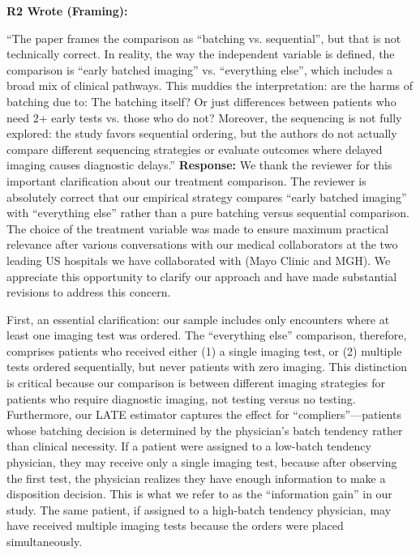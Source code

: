 \documentclass[11pt]{article}
\newenvironment{quote2}
{ \bigskip
\noindent
         \small\em
         \baselineskip=14pt
}
\newcommand{\1}{\hbox{\rm 1\kern-.35em 1}}
\begin{document}
\begin{quote2}
\textbf{R2 Wrote (Framing):}  


\noindent``The paper frames the comparison as ``batching vs. sequential'', but that is not technically correct. In reality, the way the independent variable is defined, the comparison is ``early batched imaging'' vs. ``everything else'', which includes a broad mix of clinical pathways. This muddies the interpretation: are the harms of batching due to: The batching itself? Or just differences between patients who need 2+ early tests vs. those who do not? Moreover, the sequencing is not fully explored: the study favors sequential ordering, but the authors do not actually compare different sequencing strategies or evaluate outcomes where delayed imaging causes diagnostic delays.''
\end{quote2}


\noindent\textbf{Response:} \color{blue}We thank the reviewer for this important clarification about our treatment comparison. The reviewer is absolutely correct that our empirical strategy compares ``early batched imaging'' with ``everything else'' rather than a pure batching versus sequential comparison. The choice of the treatment variable was made to ensure maximum practical relevance after various conversations with our medical collaborators at the two leading US hospitals we have collaborated with (Mayo Clinic and MGH). We appreciate this opportunity to clarify our approach and have made substantial revisions to address this concern.

First, an essential clarification: our sample includes only encounters where at least one imaging test was ordered. The ``everything else'' comparison, therefore, comprises patients who received either (1) a single imaging test, or (2) multiple tests ordered sequentially, but never patients with zero imaging. This distinction is critical because our comparison is between different imaging strategies for patients who require diagnostic imaging, not testing versus no testing. Furthermore, our LATE estimator captures the effect for ``compliers''---patients whose batching decision is determined by the physician's batch tendency rather than clinical necessity. If a patient were assigned to a low-batch tendency physician, they may receive only a single imaging test, because after observing the first test, the physician realizes they have enough information to make a disposition decision. This is what we refer to as the ``information gain'' in our study. The same patient, if assigned to a high-batch tendency physician, may have received multiple imaging tests because the orders were placed simultaneously.
\end{document}
